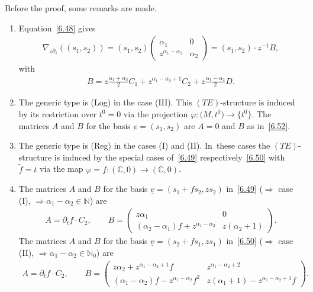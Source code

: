 \documentclass[10pt,a4paper]{amsart}
\numberwithin{equation}{section}
\numberwithin{figure}{section}
\newcommand{\N}{{\mathbb N}}
\newcommand{\C}{{\mathbb C}}
\newcommand{\www}{\widetilde}
\newcommand{\uuuu}{\underline}
\newcommand{\paa}{\partial}
\newcommand{\nnn}{\nabla}
\begin{document}
Before the proof, some remarks are made.


\begin{Remarks}\label{t6.8}\quad
\begin{enumerate}\itemsep=0pt
\item[$(i)$] Equation~\eqref{6.48} gives
\begin{gather}\label{6.52}
\nnn_{z\paa_z}((s_1,s_2))=
(s_1,s_2)\begin{pmatrix}\alpha_1 & 0 \\ z^{\alpha_1-\alpha_2}
& \alpha_2\end{pmatrix}
=(s_1,s_2)\cdot z^{-1}B,
\end{gather}
with
\begin{gather*}
B=z\frac{\alpha_1+\alpha_2}{2}C_1
+z^{\alpha_1-\alpha_2+1}C_2+z\frac{\alpha_1-\alpha_2}{2}D.
\end{gather*}

\item[$(ii)$] The generic type is (Log) in the case (III).
This $(TE)$-structure is induced by its restriction
over $t^0=0$ via the projection $\varphi\colon \big(M,t^0\big)\to\big\{t^0\big\}$.
The matrices $A$ and $B$ for the basis $\uuuu{v}=(s_1,s_2)$
are $A=0$ and $B$ as in~\eqref{6.52}.

\item[$(iii)$] The generic type is (Reg) in the cases
(I) and (II). In~these cases
the $(TE)$-structure is induced by the special
cases of~\eqref{6.49} respectively~\eqref{6.50} with
$\www f=t$ via the map $\varphi=f\colon (\C,0)\to(\C,0)$.

\item[$(iv)$] The matrices $A$ and $B$ for the basis
$\uuuu{v}=(s_1+fs_2,zs_2)$
in~\eqref{6.49} ($\Rightarrow$ case (I),
$\Rightarrow \alpha_1-\alpha_2\in\N$) are
\begin{gather}\label{6.53}
A=\paa_tf\cdot C_2,\qquad
B=\begin{pmatrix}z\alpha_1 & 0 \\ (\alpha_2-\alpha_1)f
+z^{\alpha_1-\alpha_2} & z(\alpha_2+1)\end{pmatrix}\!.
\end{gather}
The matrices $A$ and $B$ for the basis
$\uuuu{v}=(s_2+fs_1,zs_1)$
in~\eqref{6.50} ($\Rightarrow$ case (II),
$\Rightarrow \alpha_1-\alpha_2\allowbreak\in\N_0$) are
\begin{gather}\label{6.54}
A=\paa_tf\cdot C_2,\qquad
B=\begin{pmatrix}z\alpha_2+z^{\alpha_1-\alpha_2+1}f &
z^{\alpha_1-\alpha_2+2} \\ (\alpha_1-\alpha_2)f
-z^{\alpha_1-\alpha_2}f^2 & z(\alpha_1+1)-z^{\alpha_1-\alpha_2+1}f\end{pmatrix}\!.
\end{gather}


\end{enumerate}
\end{Remarks}
\end{document}
